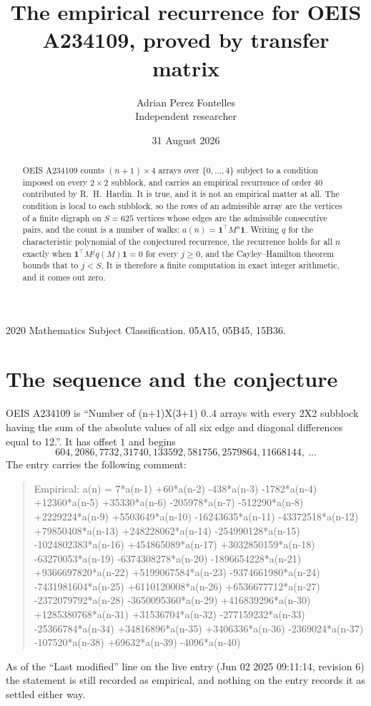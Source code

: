 \documentclass[11pt,a4paper]{article}
\title{The empirical recurrence for OEIS A234109, proved by transfer matrix}
\author{Adrian Perez Fontelles\\ \small Independent researcher}
\date{31 August 2026}
\theoremstyle{plain}
\theoremstyle{definition}
\begin{document}
\maketitle

\begin{abstract}
OEIS A234109 counts $(n+1)\times4$ arrays over $\{0,\dots,4\}$ subject to a condition imposed on
every $2\times2$ subblock, and carries an empirical recurrence of order $40$ contributed
by R.~H.~Hardin. It is true, and it is not an empirical matter at all. The condition is local
to each subblock, so the rows of an admissible array are the vertices of a finite digraph
on $S=625$ vertices whose edges are the admissible consecutive pairs, and the count is a
number of walks: $a(n)=\mathbf{1}^{\!\top}M^{n}\mathbf{1}$. Writing $q$
for the characteristic polynomial of the conjectured recurrence, the recurrence holds for all
$n$ exactly when $\mathbf{1}^{\!\top}M^{j}q(M)\mathbf{1}=0$ for every $j\ge0$, and the
Cayley--Hamilton theorem bounds that to $j<S$. It is therefore a finite computation in exact
integer arithmetic, and it comes out zero.
\end{abstract}

\noindent\small 2020 Mathematics Subject Classification. 05A15, 05B45, 15B36.\normalsize

\section{The sequence and the conjecture}

OEIS A234109 is ``Number of (n+1)X(3+1) 0..4 arrays with every 2X2 subblock having the sum of the absolute values of all six edge and diagonal differences equal to 12.''. It has offset $1$ and begins
\[
604, 2086, 7732, 31740, 133592, 581756, 2579864, 11668144,\ \dots
\]
The entry carries the following comment:
\begin{quote}\small
Empirical: a(n) = 7*a(n-1) +60*a(n-2) -438*a(n-3) -1782*a(n-4) +12360*a(n-5) +35330*a(n-6) -205978*a(n-7) -512290*a(n-8) +2229224*a(n-9) +5503649*a(n-10) -16243635*a(n-11) -43372518*a(n-12) +79850408*a(n-13) +248228062*a(n-14) -254990128*a(n-15) -1024802383*a(n-16) +454865089*a(n-17) +3032850159*a(n-18) -63270053*a(n-19) -6374308278*a(n-20) -1896654228*a(n-21) +9366697820*a(n-22) +5199067584*a(n-23) -9374661980*a(n-24) -7431981604*a(n-25) +6110120008*a(n-26) +6536677712*a(n-27) -2372079792*a(n-28) -3650095360*a(n-29) +416839296*a(n-30) +1285380768*a(n-31) +31536704*a(n-32) -277159232*a(n-33) -25366784*a(n-34) +34816896*a(n-35) +3406336*a(n-36) -2369024*a(n-37) -107520*a(n-38) +69632*a(n-39) -4096*a(n-40)
\end{quote}
As of the ``Last modified'' line on the live entry (Jun 02 2025 09:11:14, revision 6) the statement is
still recorded as empirical, and nothing on the entry records it as settled either way.
\end{document}
